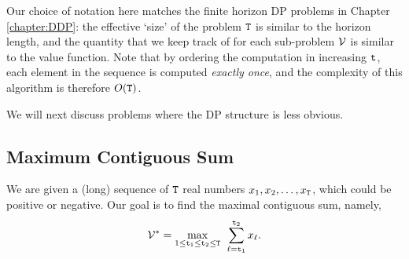 Our choice of notation here matches the finite horizon DP problems in Chapter \ref{chapter:DDP}: the effective `size' of the problem ${\tt T}$ is similar to the horizon length, and the quantity that we keep track of for each sub-problem $\mathcal{V}$ is similar to the value function. Note that by ordering the computation in increasing ${\tt t}$, each element in the sequence is computed \textit{exactly once}, and the complexity of this algorithm is therefore $O({\tt T})$.

We will next discuss problems where the DP structure is less obvious.

\subsection*{Maximum Contiguous Sum}
We are given a (long) sequence of ${\tt T}$ real numbers ${x_1},{x_2}, \ldots ,{x_{\tt T}}$, which could be positive or negative. Our goal is to find the maximal contiguous sum, namely,
\[{\mathcal{V}^*} = \mathop {\max }\limits_{1 \leq {\tt t}_1 \leq {\tt t}_2 \le {\tt T}} \;\,\sum\limits_{\ell  = {\tt t}_1}^{{\tt t}_2} {{x_\ell }} .\]

